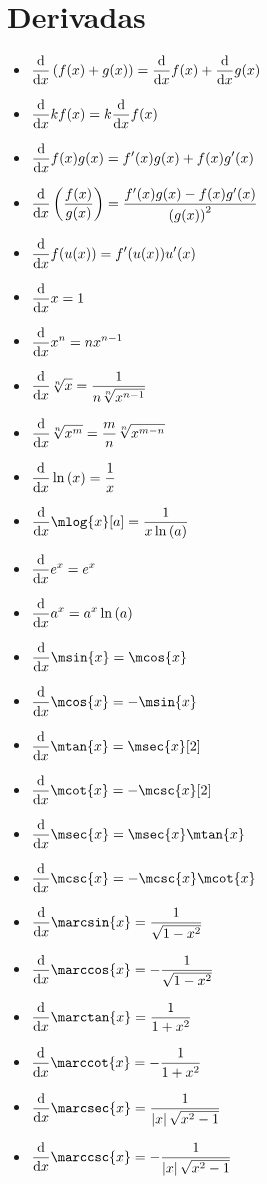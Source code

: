 \section{Derivadas}
\begin{itemize}
	\item $\ds\odv[switch-*,fun=true]{f(x) + g(x)}{x} =\odv[switch-*]{f(x)}{x} +\odv[switch-*]{g(x)}{x}$
	\item $\ds\odv[switch-*]{kf(x)}{x} =k\odv[switch-*]{f(x)}{x}$
	\item $\ds\odv[switch-*]{f(x)g(x)}{x} =f'(x)g(x) + f(x)g'(x)$
	\item $\ds\odv[switch-*,fun=true]{\dfrac{f(x)}{g(x)}}{x} =\dfrac{f'(x)g(x) - f(x)g'(x)}{\pa{g(x)}^{2}}$
	\item $\ds\odv[switch-*]{f(u(x))}{x} =f'(u(x))u'(x)$
	\item $\ds\odv[switch-*]{x}{x} = 1$
	\item $\ds\odv[switch-*]{x^{n}}{x} = nx^{n - 1}$
	\item $\ds\odv[switch-*]{\sqrt[n]{x}}{x} =\dfrac{1}{n\sqrt[n]{x^{n - 1}}}$
	\item $\ds\odv[switch-*]{\sqrt[n]{x^{m}}}{x} =\dfrac{m}{n}\sqrt[n]{x^{m - n}}$
	\item $\ds\odv[switch-*]{\mln{x}}{x} = \dfrac{1}{x}$
	\item $\ds\odv[switch-*]{\mlog{x}[a]}{x} =\dfrac{1}{x\mln{a}}$
	\item $\ds\odv[switch-*]{e^{x}}{x} = e^{x}$
	\item $\ds\odv[switch-*]{a^{x}}{x} = a^{x}\mln{a}$
	\item $\ds\odv[switch-*]{\msin{x}}{x} =\mcos{x}$
	\item $\ds\odv[switch-*]{\mcos{x}}{x} = -\msin{x}$
	\item $\ds\odv[switch-*]{\mtan{x}}{x} =\msec{x}[2]$
	\item $\ds\odv[switch-*]{\mcot{x}}{x} = -\mcsc{x}[2]$
	\item $\ds\odv[switch-*]{\msec{x}}{x} =\msec{x}\mtan{x}$
	\item $\ds\odv[switch-*]{\mcsc{x}}{x} = -\mcsc{x}\mcot{x}$
	\item $\ds\odv[switch-*]{\marcsin{x}}{x} =\dfrac{1}{\sqrt{1 - x^{2}}}$
	\item $\ds\odv[switch-*]{\marccos{x}}{x} = -\dfrac{1}{\sqrt{1 - x^{2}}}$
	\item $\ds\odv[switch-*]{\marctan{x}}{x} =\dfrac{1}{1 + x^{2}}$
	\item $\ds\odv[switch-*]{\marccot{x}}{x} = -\dfrac{1}{1 + x^{2}}$
	\item $\ds\odv[switch-*]{\marcsec{x}}{x} =\dfrac{1}{\abs{x}\sqrt{x^{2} - 1}}$
	\item $\ds\odv[switch-*]{\marccsc{x}}{x} = -\dfrac{1}{\abs{x}\sqrt{x^{2} - 1}}$
\end{itemize}